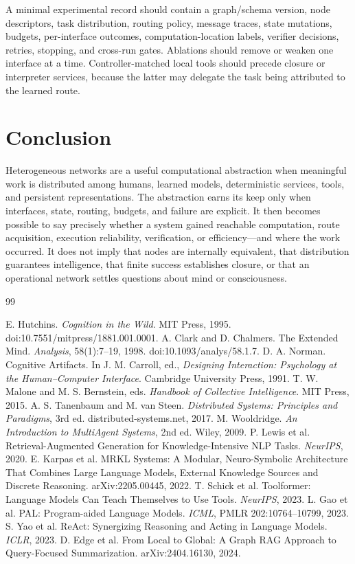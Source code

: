 \documentclass[10pt]{article}
\begin{document}
A minimal experimental record should contain a graph/schema version, node descriptors, task distribution, routing policy, message traces, state mutations, budgets, per-interface outcomes, computation-location labels, verifier decisions, retries, stopping, and cross-run gates. Ablations should remove or weaken one interface at a time. Controller-matched local tools should precede closure or interpreter services, because the latter may delegate the task being attributed to the learned route.

\section{Conclusion}

Heterogeneous networks are a useful computational abstraction when meaningful work is distributed among humans, learned models, deterministic services, tools, and persistent representations. The abstraction earns its keep only when interfaces, state, routing, budgets, and failure are explicit. It then becomes possible to say precisely whether a system gained reachable computation, route acquisition, execution reliability, verification, or efficiency---and where the work occurred. It does not imply that nodes are internally equivalent, that distribution guarantees intelligence, that finite success establishes closure, or that an operational network settles questions about mind or consciousness.

\begin{sloppypar}
\begin{thebibliography}{99}
\raggedright
{} E. Hutchins. \emph{Cognition in the Wild}. MIT Press, 1995. doi:10.7551/mitpress/1881.001.0001.
 A. Clark and D. Chalmers. The Extended Mind. \emph{Analysis}, 58(1):7--19, 1998. doi:10.1093/analys/58.1.7.
 D. A. Norman. Cognitive Artifacts. In J. M. Carroll, ed., \emph{Designing Interaction: Psychology at the Human--Computer Interface}. Cambridge University Press, 1991.
 T. W. Malone and M. S. Bernstein, eds. \emph{Handbook of Collective Intelligence}. MIT Press, 2015.
 A. S. Tanenbaum and M. van Steen. \emph{Distributed Systems: Principles and Paradigms}, 3rd ed. distributed-systems.net, 2017.
 M. Wooldridge. \emph{An Introduction to MultiAgent Systems}, 2nd ed. Wiley, 2009.
 P. Lewis et al. Retrieval-Augmented Generation for Knowledge-Intensive NLP Tasks. \emph{NeurIPS}, 2020.
 E. Karpas et al. MRKL Systems: A Modular, Neuro-Symbolic Architecture That Combines Large Language Models, External Knowledge Sources and Discrete Reasoning. arXiv:2205.00445, 2022.
 T. Schick et al. Toolformer: Language Models Can Teach Themselves to Use Tools. \emph{NeurIPS}, 2023.
 L. Gao et al. PAL: Program-aided Language Models. \emph{ICML}, PMLR 202:10764--10799, 2023.
 S. Yao et al. ReAct: Synergizing Reasoning and Acting in Language Models. \emph{ICLR}, 2023.
 D. Edge et al. From Local to Global: A Graph RAG Approach to Query-Focused Summarization. arXiv:2404.16130, 2024.
\end{thebibliography}
\end{sloppypar}
\end{document}
